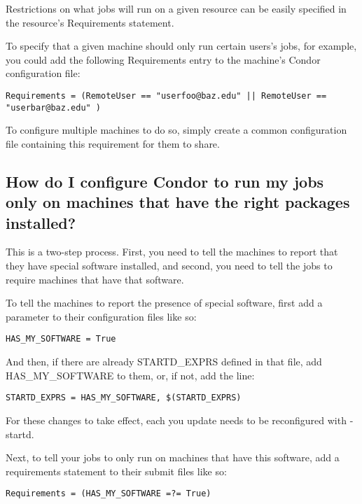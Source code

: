 Restrictions on what jobs will run on a given resource can be easily
specified in the resource's Requirements statement.

To specify that a given machine should only run certain users's jobs,
for example, you could add the following Requirements entry to the
machine's Condor configuration file:

\begin{verbatim}Requirements = (RemoteUser == "userfoo@baz.edu" || RemoteUser == "userbar@baz.edu" )\end{verbatim}

To configure multiple machines to do so, simply create a common
configuration file containing this requirement for them to share.

\subsection{How do I configure Condor to run my jobs only on machines
that have the right packages installed?}

This is a two-step process.
First, you need to tell the machines to report that they have special
software installed, and second, you need to tell the jobs to require
machines that have that software.

To tell the machines to report the presence of special software, first
add a parameter to their configuration files like so:

\begin{verbatim}HAS_MY_SOFTWARE = True\end{verbatim}

And then, if there are already STARTD\_EXPRS defined in that file, add
HAS\_MY\_SOFTWARE to them, or, if not, add the line:

\begin{verbatim}STARTD_EXPRS = HAS_MY_SOFTWARE, $(STARTD_EXPRS)\end{verbatim}

\Note For these changes to take effect, each  you update
needs to be reconfigured with  -startd.

Next, to tell your jobs to only run on machines that have this
software, add a requirements statement to their submit files like so:

\begin{verbatim}Requirements = (HAS_MY_SOFTWARE =?= True)\end{verbatim}

